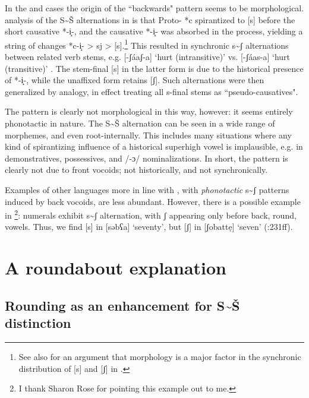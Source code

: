 \documentclass[output=paper,newtxmath,modfonts,nonflat]{langsci/langscibook}
\begin{document}
In the  and  cases the origin of the ``backwards" pattern seems to be morphological.  analysis of the S{\textasciitilde}Š alternations in  is that Proto- *c spirantized to [s] before the short causative *-i̝-, and the causative *-i̝- was absorbed in the process, yielding a string of changes *c-i̝- > sj > [s].\footnote{See also \citet{Bennett&Pulleyblank:2014} for an argument that morphology is a major factor in the synchronic distribution of [s] and [ʃ] in .} This resulted in synchronic s{\textasciitilde}ʃ alternations between related verb stems, e.g. [-ʃáaʃ-a] ‘hurt (intransitive)’ vs. [-ʃáas-a] ‘hurt (transitive)’ \citep[85]{Hyman2003b}. The stem-final [s] in the latter form is due to the historical presence of *-i̝-, while the unaffixed form retains [ʃ]. Such alternations were then generalized by analogy, in effect treating all s-final stems as ``pseudo-causatives".

The  pattern is clearly not morphological in this way, however: it seems entirely phonotactic in nature. The S{\textasciitilde}Š alternation can be seen in a wide range of morphemes, and even root-internally. This includes many situations where any kind of spirantizing influence of a historical superhigh vowel is implausible, e.g. in demonstratives, possessives, and /-ɔ/ nominalizations. In short, the  pattern is clearly not due to front vocoids; not historically, and not synchronically.

Examples of other languages more in line with , with \textit{phonotactic} s{\textasciitilde}ʃ patterns induced by back vocoids, are less abundant. However, there is a possible example in \footnote{I thank Sharon Rose for pointing this example out to me.}: numerals exhibit s{\textasciitilde}ʃ alternation, with ʃ appearing only before back, round, vowels. Thus, we find [s] in [səbʕa] ‘seventy’, but [ʃ] in [ʃobattẹ] ‘seven’ (\citealt{Banksira2000}:231ff). 

\section{A roundabout explanation}\label{sec:bennett:4}

\subsection{Rounding as an enhancement for S{\textasciitilde}Š distinction}\label{sec:bennett:4.1}
\end{document}
